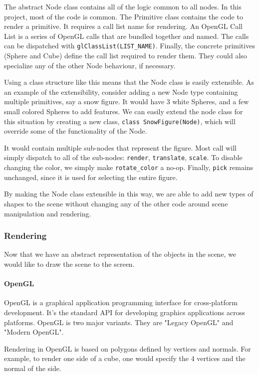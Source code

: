 \documentclass[11pt,draft]{article}
\begin{document}
The abstract Node class contains all of the logic common to all nodes. In this project, most of the code is common.
The Primitive class contains the code to render a primitive. It requires a call list name for rendering. An OpenGL Call List is a series of
OpenGL calls that are bundled together and named. The calls can be dispatched with \lstinline$glClassList(LIST_NAME)$.
Finally, the concrete primitives (Sphere and Cube) define the call list required to render them. They could also specialize any of the other Node behaviour, if necessary.

Using a class structure like this means that the Node class is easily extensible. As an example of the extensibility, consider adding a new Node type
containing multiple primitives, say a snow figure. It would have 3 white Spheres, and a few small colored Spheres to add features. We can easily
extend the node class for this situation by creating a new class, \lstinline$class SnowFigure(Node)$, which will override some of the functionality of the Node.

It would contain multiple sub-nodes that represent the figure.  Most call will simply dispatch to all of the sub-nodes: \lstinline$render$, \lstinline$translate$, \lstinline$scale$.
To disable changing the color, we simply make \lstinline$rotate_color$ a no-op. Finally, \lstinline$pick$ remains unchanged, since it is used for selecting the entire
figure.

By making the Node class extensible in this way, we are able to add new types of shapes to the scene without changing any of the other code around scene
manipulation and rendering.

\subsubsection{Rendering}
Now that we have an abstract representation of the objects in the scene, we would like to draw the scene to the screen.

\paragraph{OpenGL}
OpenGL is a graphical application programming interface for cross-platform development. It's the standard API for developing graphics applications across platforms.
OpenGL is two major variants. They are "Legacy OpenGL" and "Modern OpenGL".

Rendering in OpenGL is based on polygons defined by vertices and normals. For example, to render one side of a cube, one would specify the 4 vertices and the normal of the side.
\end{document}
